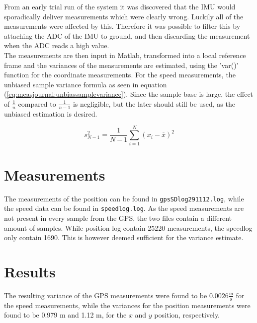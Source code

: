 From an early trial run of the system it was discovered that the IMU would sporadically deliver measurements which were clearly wrong. Luckily all of the measurements were affected by this. Therefore it was possible to filter this by attaching the ADC of the IMU to ground, and then discarding the measurement when the ADC reads a high value.\\
The measurements are then input in Matlab, transformed into a local reference frame and the variances of the measurements are estimated, using the 'var()' function for the coordinate measurements. For the speed measurements, the unbiased sample variance formula as seen in equation (\ref{eq:measjournal:unbiassamplevariance}). Since the sample base is large, the effect of $\frac{1}{n}$ compared to $\frac{1}{n-1}$ is negligible, but the later should still be used, as the unbiased estimation is desired.

\begin{equation}
s^2_{N-1} = \frac{1}{N-1} \sum^N_{i=1}(x_i-\overline{x})^2
\end{equation}
\label{eq:measjournal:unbiassamplevariance}
\section{Measurements}
The measurements of the position can be found in \texttt{gpsSDlog291112.log}, while the speed data can be found in \texttt{speedlog.log}. As the speed measurements are not present in every sample from the GPS, the two files contain a different amount of samples. While position log contain 25220 measurements, the speedlog only contain 1690. This is however deemed sufficient for the variance estimate.

\section{Results}
The resulting variance of the GPS measurements were found to be $0.0026\frac{\mathrm{m}}{\mathrm{s}}$ for the speed measurements, while the variances for the position measurements were found to be 0.979 m and 1.12 m, for the $x$ and $y$ position, respectively.
